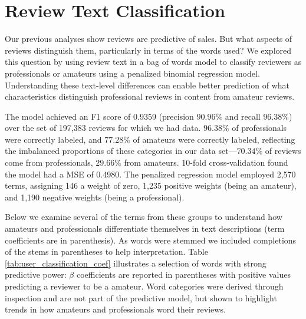 \documentclass{sig-alternate}
\begin{document}



\section{Review Text Classification}
Our previous analyses show reviews are predictive of sales. But what
aspects of reviews distinguish them, particularly in terms of the words
used? We explored this question by using review text in a bag of words
model to classify reviewers as professionals or amateurs using a
penalized binomial regression model. Understanding these text-level
differences can enable better prediction of what characteristics
distinguish professional reviews in content from amateur reviews.

The model achieved an F1 score of $0.9359$ (precision $90.96\%$ and
recall $96.38\%$) over the set of 197,383 reviews for which we had data. $96.38\%$ of professionals were correctly labeled, and $77.28\%$ of amateurs were correctly labeled, reflecting the imbalanced proportions of these categories in our data set---$70.34\%$ of reviews come from professionals, $29.66\%$ from amateurs. 10-fold cross-validation found the model had a MSE of 0.4980. The penalized regression model employed 2,570 terms, assigning 146 a weight of zero, 1,235 positive weights (being an amateur), and 1,190 negative weights (being a professional). 

Below we examine several of the terms from these groups to understand how amateurs and professionals differentiate themselves in text descriptions (term coefficients are in parenthesis). As words were stemmed we included completions of the stems in parentheses to help interpretation. Table \ref{tab:user_classification_coef} illustrates a selection of words with strong predictive power: $\beta$ coefficients are reported in parentheses with positive values predicting a reviewer to be a amateur. Word categories were derived through inspection and are not part of the predictive model, but shown to highlight trends in how amateurs and professionals word their reviews. 
\end{document}
